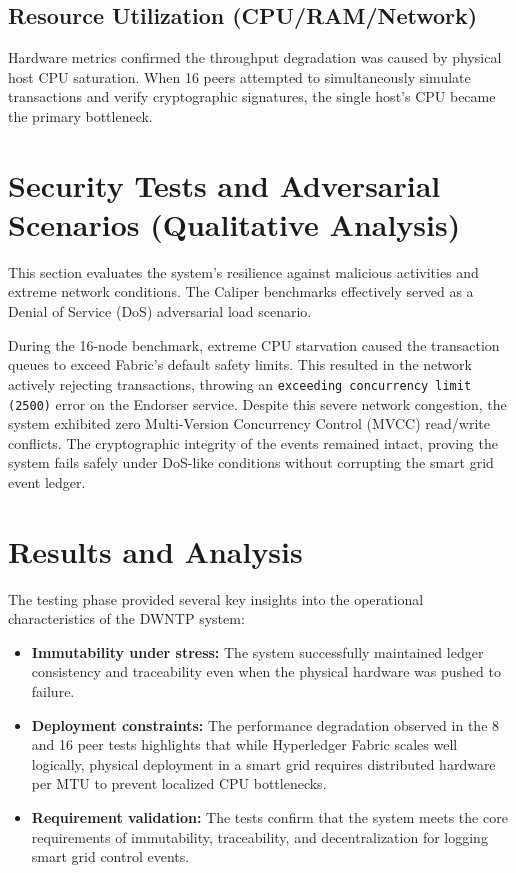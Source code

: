 \subsection{Resource Utilization (CPU/RAM/Network)}
Hardware metrics confirmed the throughput degradation was caused by physical host CPU saturation. When 16 peers attempted to simultaneously simulate transactions and verify cryptographic signatures, the single host's CPU became the primary bottleneck.

\section{Security Tests and Adversarial Scenarios (Qualitative Analysis)}
This section evaluates the system's resilience against malicious activities and extreme network conditions. The Caliper benchmarks effectively served as a Denial of Service (DoS) adversarial load scenario.

During the 16-node benchmark, extreme CPU starvation caused the transaction queues to exceed Fabric's default safety limits. This resulted in the network actively rejecting transactions, throwing an \texttt{exceeding concurrency limit (2500)} error on the Endorser service. Despite this severe network congestion, the system exhibited zero Multi-Version Concurrency Control (MVCC) read/write conflicts. The cryptographic integrity of the events remained intact, proving the system fails safely under DoS-like conditions without corrupting the smart grid event ledger.


\section{Results and Analysis}
The testing phase provided several key insights into the operational characteristics of the DWNTP system:
\begin{itemize}
    \item \textbf{Immutability under stress:} The system successfully maintained ledger consistency and traceability even when the physical hardware was pushed to failure.
    \item \textbf{Deployment constraints:} The performance degradation observed in the 8 and 16 peer tests highlights that while Hyperledger Fabric scales well logically, physical deployment in a smart grid requires distributed hardware per MTU to prevent localized CPU bottlenecks.
    \item \textbf{Requirement validation:} The tests confirm that the system meets the core requirements of immutability, traceability, and decentralization for logging smart grid control events.
\end{itemize}
